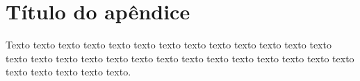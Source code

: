 \chapter{Título do apêndice}
\label{cap:ape}

Texto texto texto texto texto texto texto texto texto texto texto texto texto
texto texto texto texto texto texto texto texto texto texto texto texto texto
texto texto texto texto texto texto.
